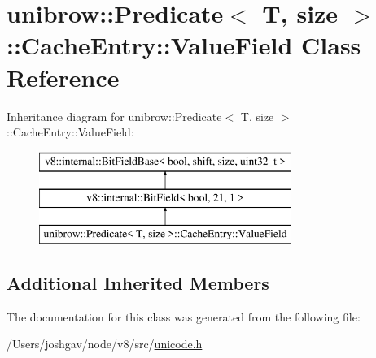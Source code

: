 \hypertarget{classunibrow_1_1_predicate_1_1_cache_entry_1_1_value_field}{}\section{unibrow\+:\+:Predicate$<$ T, size $>$\+:\+:Cache\+Entry\+:\+:Value\+Field Class Reference}
\label{classunibrow_1_1_predicate_1_1_cache_entry_1_1_value_field}
Inheritance diagram for unibrow\+:\+:Predicate$<$ T, size $>$\+:\+:Cache\+Entry\+:\+:Value\+Field\+:\begin{figure}[H]
\begin{center}
\leavevmode
\includegraphics[height=3.000000cm]{classunibrow_1_1_predicate_1_1_cache_entry_1_1_value_field}
\end{center}
\end{figure}
\subsection*{Additional Inherited Members}


The documentation for this class was generated from the following file\+:\begin{DoxyCompactItemize}
\item 
/\+Users/joshgav/node/v8/src/\hyperlink{unicode_8h}{unicode.\+h}\end{DoxyCompactItemize}
